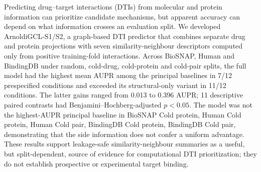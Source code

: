 Predicting drug--target interactions (DTIs) from molecular and protein information can prioritize candidate mechanisms, but apparent accuracy can depend on what information crosses an evaluation split. We developed ArnoldiGCL-S1/S2, a graph-based DTI predictor that combines separate drug and protein projections with seven similarity-neighbour descriptors computed only from positive training-fold interactions. Across BioSNAP, Human and BindingDB under random, cold-drug, cold-protein and cold-pair splits, the full model had the highest mean AUPR among the principal baselines in 7/12 prespecified conditions and exceeded its structural-only variant in 11/12 conditions. The latter gains ranged from 0.013 to 0.396 AUPR; 11 descriptive paired contrasts had Benjamini--Hochberg-adjusted $p<0.05$. The model was not the highest-AUPR principal baseline in BioSNAP Cold protein, Human Cold protein, Human Cold pair, BindingDB Cold protein, BindingDB Cold pair, demonstrating that the side information does not confer a uniform advantage. These results support leakage-safe similarity-neighbour summaries as a useful, but split-dependent, source of evidence for computational DTI prioritization; they do not establish prospective or experimental target binding.
